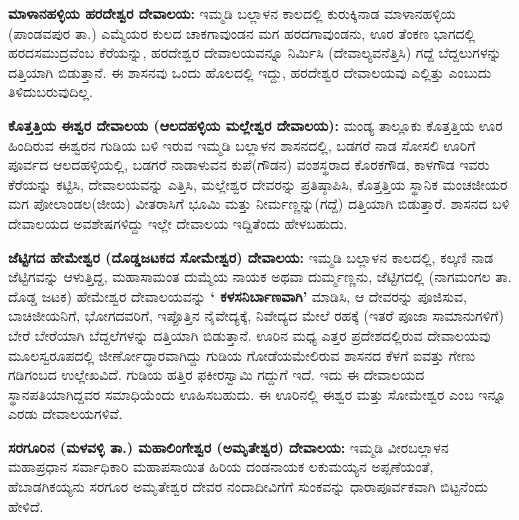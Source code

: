 \textbf{ಮಾಳಾನಹಳ್ಳಿಯ ಹರದೇಶ್ವರ ದೇವಾಲಯ:} ಇಮ್ಮಡಿ ಬಲ್ಲಾಳನ ಕಾಲದಲ್ಲಿ ಕುರುಕ್ಕಿನಾಡ ಮಾಳಾನಹಳ್ಳಿಯ (ಪಾಂಡವಪುರ ತಾ.) ಎಮ್ಮೆಯರ ಕುಲದ ಚಾಕಗಾವುಂಡನ ಮಗ ಹರದಗಾವುಂಡನು, ಊರ ತೆಂಕಣ ಭಾಗದಲ್ಲಿ ಹರದಸಮುದ್ರವೆಂಬ ಕೆರೆಯನ್ನು, ಹರದೇಶ್ವರ ದೇವಾಲಯವನ್ನೂ ನಿರ್ಮಿಸಿ (ದೇವಾಲ್ಯವನೆತ್ತಿಸಿ) ಗದ್ದೆ ಬೆದ್ದಲುಗಳನ್ನು ದತ್ತಿಯಾಗಿ ಬಿಡುತ್ತಾನೆ. ಈ ಶಾಸನವು ಒಂದು ಹೊಲದಲ್ಲಿ ಇದ್ದು, ಹರದೇಶ್ವರ ದೇವಾಲಯವು ಎಲ್ಲಿತ್ತು ಎಂಬುದು ತಿಳಿದುಬರುವುದಿಲ್ಲ.

\textbf{ಕೊತ್ತತ್ತಿಯ ಈಶ್ವರ ದೇವಾಲಯ (ಆಲದಹಳ್ಳಿಯ ಮಲ್ಲೇಶ್ವರ ದೇವಾಲಯ):} ಮಂಡ್ಯ ತಾಲ್ಲೂಕು ಕೊತ್ತತ್ತಿಯ ಊರ ಹಿಂದಿರುವ ಈಶ್ವರನ ಗುಡಿಯ ಬಳಿ ಇರುವ ಇಮ್ಮಡಿ ಬಲ್ಲಾಳನ ಶಾಸನದಲ್ಲಿ, ಬಡಗರೆ ನಾಡ ಸೋಸಲಿ ಊರಿಗೆ ಪೂರ್ವದ ಆಲದಹಳ್ಳಿಯಲ್ಲಿ, ಬಡಗರೆ ನಾಡಾಳುವನ ಕುಪೆ(ಗೌಡನ) ವಂಶಸ್ಥರಾದ ಕೊರಕಗೌಡ, ಕಾಳಗೌಡ ಇವರು ಕೆರೆಯನ್ನು ಕಟ್ಟಿಸಿ, ದೇವಾಲಯವನ್ನು ಎತ್ತಿಸಿ, ಮಲ್ಲೇಶ್ವರ ದೇವರನ್ನು ಪ್ರತಿಷ್ಠಾಪಿಸಿ, ಕೊತ್ತತ್ತಿಯ ಸ್ಥಾನಿಕ ಮಂಚಜೀಯರ ಮಗ \hbox{ಪೋಲಾಂಡಲ}(ಜೀಯ) ವೀತರಾಸಿಗೆ ಭೂಮಿ ಮತ್ತು ನೀರ್ಮಣ್ಣನ್ನು(ಗದ್ದೆ) ದತ್ತಿಯಾಗಿ ಬಿಡುತ್ತಾರೆ. ಶಾಸನದ ಬಳಿ ದೇವಾಲಯದ ಅವಶೇಷಗಳಿದ್ದು ಇಲ್ಲೇ ದೇವಾಲಯ ಇದ್ದಿತೆಂದು ಹೇಳಬಹುದು.

\textbf{ಜೆಟ್ಟಿಗದ ಹೇಮೇಶ್ವರ (ದೊಡ್ಡಜಟಕದ ಸೋಮೇಶ್ವರ) ದೇವಾಲಯ:} ಇಮ್ಮಡಿ ಬಲ್ಲಾಳನ ಕಾಲದಲ್ಲಿ, ಕಲ್ಕಣಿ ನಾಡ ಜೆಟ್ಟಿಗವನ್ನು ಆಳುತ್ತಿದ್ದ, ಮಹಾಸಾಮಂತ ದುಮ್ಮೆಯ ನಾಯಕ ಅಥವಾ ದುರ್ಮ್ಮಣ್ಣನು, ಜೆಟ್ಟಿಗದಲ್ಲಿ (ನಾಗಮಂಗಲ ತಾ. ದೊಡ್ಡ ಜಟಕ) ಹೇಮೇಶ್ವರ ದೇವಾಲಯವನ್ನು \textbf{` ಕಳಸನಿರ್ಬಾಣವಾಗಿ'} ಮಾಡಿಸಿ, ಆ ದೇವರನ್ನು ಪೂಜಿಸುವ, ಬಾಚಿಜೀಯನಿಗೆ, ಭೋಗದವರಿಗೆ, ಇಪ್ಪೊತ್ತಿನ ನೈವೇದ್ಯಕ್ಕೆ, ನಿವೇದ್ಯದ ಮೇಲೆ ರಹಕ್ಕೆ (ಇತರೆ ಪೂಜಾ ಸಾಮಾನುಗಳಿಗೆ) ಬೇರೆ ಬೇರೆಯಾಗಿ ಬೆದ್ದಲೆಗಳನ್ನು ದತ್ತಿಯಾಗಿ ಬಿಡುತ್ತಾನೆ. ಊರಿನ ಮಧ್ಯ ಎತ್ತರ ಪ್ರದೇಶದಲ್ಲಿರುವ ದೇವಾಲಯವು ಮೂಲಸ್ವರೂಪದಲ್ಲಿ ಜೀರ್ಣೋದ್ಧಾರವಾಗಿದ್ದು ಗುಡಿಯ ಗೋಡೆಯಮೇಲಿರುವ ಶಾಸನದ ಕೆಳಗೆ ಐವತ್ತು ಗೇಣು ಗಡಿಗಂಬದ ಉಲ್ಲೇಖವಿದೆ. ಗುಡಿಯ ಹತ್ತಿರ ಫಕೀರಸ್ವಾಮಿ ಗದ್ದುಗೆ ಇದೆ. ಇದು ಈ ದೇವಾಲಯದ ಸ್ಥಾನಪತಿಯಾಗಿದ್ದವರ ಸಮಾಧಿಯೆಂದು ಊಹಿಸಬಹುದು. ಈ ಊರಿನಲ್ಲಿ ಈಶ್ವರ ಮತ್ತು ಸೋಮೇಶ್ವರ ಎಂಬ ಇನ್ನೂ ಎರಡು ದೇವಾಲಯಗಳಿವೆ.

\textbf{ಸರಗೂರಿನ (ಮಳವಳ್ಳಿ ತಾ.) ಮಹಾಲಿಂಗೇಶ್ವರ (ಅಮೃತೇಶ್ವರ) ದೇವಾಲಯ:} ಇಮ್ಮಡಿ ವೀರಬಲ್ಲಾಳನ ಮಹಾಪ್ರಧಾನ ಸರ್ವಾಧಿಕಾರಿ ಮಹಾಪಸಾಯಿತ ಹಿರಿಯ ದಂಡನಾಯಕ ಲಕುಮಯ್ಯನ ಅಪ್ಪಣೆಯಂತೆ, ಹೆಬಾಡಗಿಕಯ್ಯನು ಸರಗೂರ ಅಮೃತೇಶ್ವರ ದೇವರ ನಂದಾದೀವಿಗೆಗೆ ಸುಂಕವನ್ನು ಧಾರಾಪೂರ್ವಕವಾಗಿ ಬಿಟ್ಟನೆಂದು ಹೇಳಿದೆ.

